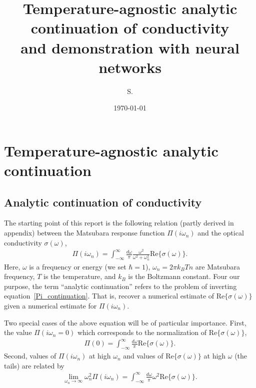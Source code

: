 \documentclass[notitlepage,11pt,nofootinbib]{revtex4-1}
\begin{document}
\title{\bf Temperature-agnostic analytic continuation of conductivity\\and demonstration with neural networks}
\author{S. }
\date{\today}

\begin{abstract}

\end{abstract}

\maketitle
\vspace{-.5cm}
\tableofcontents

\section{Temperature-agnostic analytic continuation}

\subsection{Analytic continuation of conductivity}

The starting point of this report is the following relation (partly derived in appendix) between the Matsubara response function $\Pi(i\omega_n)$ and the optical conductivity $\sigma(\omega)$,
\begin{align}
\Pi(i\omega_n) 
=
\int_{-\infty}^{\infty} \frac{d\omega}{\pi} \frac{\omega^2}{\omega^2+\omega_n^2}
\text{Re}\{ \sigma(\omega) \}.
\label{Pi_continuation}
\end{align}
Here, $\omega$ is a frequency or energy (we set $\hbar=1$), $\omega_n=2\pi k_BTn$ are Matsubara frequency, $T$ is the temperature, and $k_B$ is the Boltzmann constant.
Four our purpose, the term ``analytic continuation'' refers to the problem of inverting equation~\eqref{Pi_continuation}. That is, recover a numerical estimate of $\text{Re}\{ \sigma(\omega) \}$ given a numerical estimate for $\Pi(i\omega_n)$.


Two special cases of the above equation will be of particular importance. First, the value $\Pi(i\omega_n=0)$ which corresponds to the normalization of $\text{Re}\{ \sigma(\omega) \}$,
\begin{align}
\Pi(0) 
=
\int_{-\infty}^{\infty} \frac{d\omega}{\pi}
\text{Re}\{ \sigma(\omega) \}.
\label{Pi_normalization}
\end{align}
Second, values of $\Pi(i\omega_n)$ at high $\omega_n$ and values of $\text{Re}\{ \sigma(\omega) \}$ at high $\omega$ (the tails) are related by
\begin{align}
\lim_{\omega_n\rightarrow\infty}
\omega_n^2
\Pi(i\omega_n)
=
\int_{-\infty}^{\infty} \frac{d\omega}{\pi}\omega^2 
\text{Re}\{ \sigma(\omega) \}.
\label{Pi_moment}
\end{align}
\end{document}
